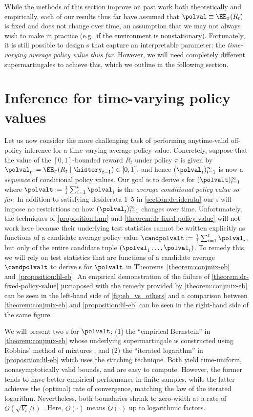 While the methods of this section improve on past work both theoretically and empirically, each of our results thus far have assumed that $\polval \equiv \EE_{\pi}(R_t)$ is fixed and does not change over time, an assumption that we may not always wish to make in practice (e.g.~if the environment is nonstationary). Fortunately, it is still possible to design \cs{}s that capture an interpretable parameter: the \emph{time-varying average policy value thus far}. However, we will need completely different supermartingales to achieve this, which we outline in the following section.

\section{Inference for time-varying policy values}\label{section:time-varying}
Let us now consider the more challenging task of performing anytime-valid off-policy inference for a time-varying average policy value. Concretely, suppose that the value of the $[0, 1]$-bounded reward $R_t$ under policy $\pi$ is given by $\polval_t := \EE_{\pi}(R_t \mid \history_{t-1}) \in [0, 1]$, and hence $(\polval_t)_{t=1}^\infty$ is now a \emph{sequence} of conditional policy values. Our goal is to derive \cs{}s for $(\polvalt)_{t=1}^\infty$ where $\polvalt := \frac{1}{t} \sum_{i=1}^t \polval_i$ is the \emph{average conditional policy value so far}. In addition to satisfying desiderata 1--5 in \cref{section:desiderata} our \cs{}s will impose no restrictions on how $(\polval_t)_{t=1}^\infty$ changes over time. Unfortunately, the techniques of \cref{proposition:kmr} and \cref{theorem:dr-fixed-policy-value} will not work here because their underlying test statistics
cannot be written explicitly as functions of a candidate average policy value $\candpolvalt := \frac{1}{t}\sum_{i=1}^t \polval_i$, but only of the entire candidate tuple $(\polval_1 \dots, \polval_t)$. To remedy this, we will rely on test statistics that are functions of a candidate average $\candpolvalt$ to derive \cs{}s for $\polvalt$ in Theorems~\ref{theorem:conjmix-eb} and~\ref{proposition:lil-eb}. An empirical demonstration of the failure of \cref{theorem:dr-fixed-policy-value} juxtaposed with the remedy provided by \cref{theorem:conjmix-eb} can be seen in the left-hand side of \cref{fig:eb_vs_others} and a comparison between \cref{theorem:conjmix-eb} and \cref{proposition:lil-eb} can be seen in the right-hand side of the same figure.

We will present two \cs{}s for $\polvalt$: (1) the ``empirical Bernstein'' \cs{} in \cref{theorem:conjmix-eb} whose underlying supermartingale is constructed using Robbins' method of mixtures \citep{robbins1970statistical}, and (2) the ``iterated logarithm'' \cs{} in \cref{proposition:lil-eb} which uses the stitching technique. Both yield time-uniform, nonasymptotically valid bounds, and are easy to compute. However, the former tends to have better empirical performance in finite samples, while the latter achieves the (optimal) rate of convergence, matching the law of the iterated logarithm. Nevertheless, both boundaries shrink to zero-width at a rate of $\widetilde O(\sqrt{V_t} / t)$ \citep{howard2018uniform}. Here, $\widetilde O(\cdot)$ means $O(\cdot)$ up to logarithmic factors.

